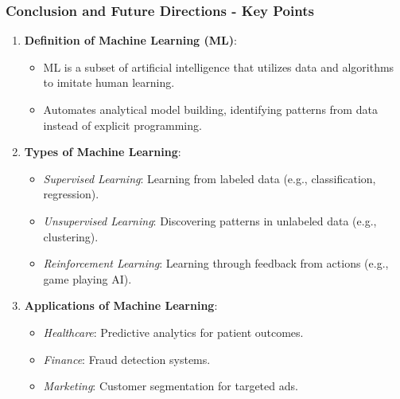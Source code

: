 \documentclass[aspectratio=169]{beamer}
\begin{document}
\begin{frame}[fragile]
    \frametitle{Conclusion and Future Directions - Key Points}
    \begin{enumerate}
        \item \textbf{Definition of Machine Learning (ML)}:
        \begin{itemize}
            \item ML is a subset of artificial intelligence that utilizes data and algorithms to imitate human learning.
            \item Automates analytical model building, identifying patterns from data instead of explicit programming.
        \end{itemize}
        
        \item \textbf{Types of Machine Learning}:
        \begin{itemize}
            \item \textit{Supervised Learning}: Learning from labeled data (e.g., classification, regression).
            \item \textit{Unsupervised Learning}: Discovering patterns in unlabeled data (e.g., clustering).
            \item \textit{Reinforcement Learning}: Learning through feedback from actions (e.g., game playing AI).
        \end{itemize}
        
        \item \textbf{Applications of Machine Learning}:
        \begin{itemize}
            \item \textit{Healthcare}: Predictive analytics for patient outcomes.
            \item \textit{Finance}: Fraud detection systems.
            \item \textit{Marketing}: Customer segmentation for targeted ads.
        \end{itemize}
    \end{enumerate}
\end{frame}
\end{document}
